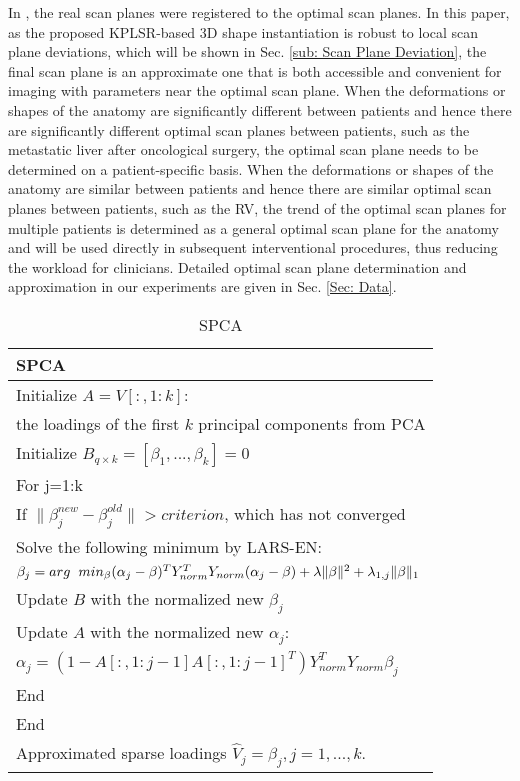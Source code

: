 \documentclass[review]{elsarticle}
\begin{document}
In \citep{lee2010dynamic}, the real scan planes were registered to the optimal scan planes. In this paper, as the proposed KPLSR-based 3D shape instantiation is robust to local scan plane deviations, which will be shown in Sec. \ref{sub: Scan Plane Deviation}, the final scan plane is an approximate one that is both accessible and convenient for imaging with parameters near the optimal scan plane. When the deformations or shapes of the anatomy are significantly different between patients and hence there are significantly different optimal scan planes between patients, such as the metastatic liver after oncological surgery, the optimal scan plane needs to be determined on a patient-specific basis. When the deformations or shapes of the anatomy are similar between patients and hence there are similar optimal scan planes between patients, such as the RV, the trend of the optimal scan planes for multiple patients is determined as a general optimal scan plane for the anatomy and will be used directly in subsequent interventional procedures, thus reducing the workload for clinicians. Detailed optimal scan plane determination and approximation in our experiments are given in Sec. \ref{Sec: Data}.

\begin{table}
\centering
\caption{SPCA \citep{zou2006sparse}}
\begin{tabular}{l}
\hline 
\textbf{SPCA} \vspace{0.5mm} \\
\hline 
Initialize $A=V[:,1:k]$:\\
\hspace{0.5cm}the loadings of the first $k$ principal components from PCA\\ 
Initialize $B_{q\times k}=[\beta_1,...,\beta_k]=0$\\
For j=1:k\\
\hspace{0.5cm}If $\|\beta_j^{new}-\beta_j^{old}\|>criterion$, which has not converged\\
\hspace{1cm}Solve the following minimum by LARS-EN: \\
\hspace{1.5cm}$\beta_j=arg\hspace{0.2cm}min_{\beta}(\alpha_j-\beta)^TY_{norm}^TY_{norm}(\alpha_j-\beta)+\lambda\|\beta\|^2+\lambda_{1,j}\|\beta\|_1$\\
\hspace{1cm}Update $B$ with the normalized new $\beta_j$\\
\hspace{1cm}Update $A$ with the normalized new $\alpha_j$:\\
\hspace{1.5cm}$\alpha_j=(1-A[:,1:j-1]A[:,1:j-1]^T)Y_{norm}^TY_{norm}\beta_j$\\
\hspace{0.5cm}End\\
End\\
Approximated sparse loadings $\hat{V}_j=\beta_j, j=1,...,k.$\\
\hline
\end{tabular}
\label{tab:SPCA} 
\end{table}
\end{document}
